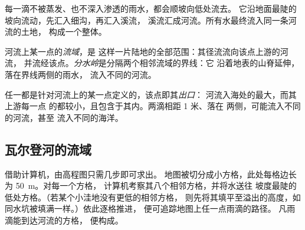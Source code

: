 每一滴不被蒸发、也不深入渗透的雨水，都会顺坡向低处流去。
它沿地面最陡的坡向流动，先汇入细沟，再汇入溪流，
溪流汇成河流。所有水最终流入同一条河流的土地，
构成一个整体。

\begin{definition}[流域；分水岭]\label{def:g10:drainage-basins:drainage-basin}
河流上某一点的\emph{流域}，是
这样一片陆地的全部范围：其径流流向该点上游的河流，
并流经该点。\emph{分水岭}是分隔两个相邻流域的界线：它
沿着地表的山脊延伸，落在界线两侧的雨水，
流入不同的河流。
%
\end{definition}

任一都是针对河流上的某一点定义的，该点即其\emph{出口}：
河流入海处的最大，而其上游每一点
的都较小，且包含于其内。两滴相距 1 米、落在
两侧，可能流入不同的河流，甚至
流入不同的海洋。

\subsection*{瓦尔登河的流域}

借助计算机，由高程图只需几步即可求出。
地图被切分成小方格，此处每格边长为 \qty{50}{m}。对每一个方格，
计算机考察其八个相邻方格，并将水送往
坡度最陡的低处方格。（若某个小洼地没有更低的相邻方格，
则先将其填平至溢出的高度，如同水坑被填满一样。）依此逐格推进，
便可追踪地图上任一点雨滴的路径。
凡雨滴能到达河流的方格，
便构成。


